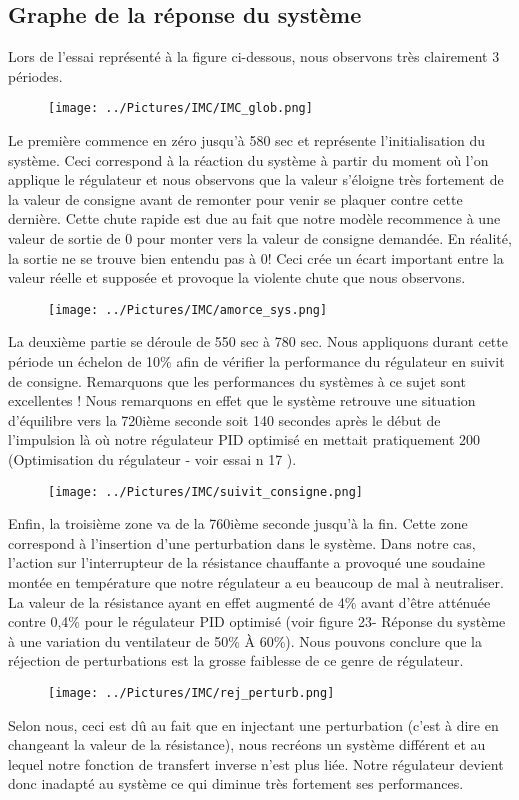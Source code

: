 \subsection{Graphe de la réponse du système}
Lors de l'essai représenté à la figure ci-dessous, nous observons très clairement 3 périodes.
\begin{figure}[H]
\texttt{[image: ../Pictures/IMC/IMC\_glob.png]}
\end{figure}
Le première commence en zéro jusqu'à 580 sec et représente l'initialisation du système. Ceci correspond à la réaction du système à partir du moment où l'on applique le régulateur et nous observons que la valeur s'éloigne très fortement de la valeur de consigne avant de remonter pour venir se plaquer contre cette dernière. Cette chute rapide est due au fait que notre modèle recommence à une valeur de sortie de 0 pour monter vers la valeur de consigne demandée. En réalité, la sortie ne se trouve bien entendu pas à 0! Ceci crée un écart important entre la valeur réelle et supposée et provoque la violente chute que nous observons.

\begin{figure}[H]
\texttt{[image: ../Pictures/IMC/amorce\_sys.png]}
\end{figure}
La deuxième partie se déroule de 550 sec à 780 sec. Nous appliquons durant cette période un échelon de 10\% afin de vérifier la performance du régulateur en suivit de consigne. Remarquons que les performances du systèmes à ce sujet sont excellentes ! Nous remarquons en effet que le système retrouve une situation d'équilibre vers la 720ième seconde soit 140 secondes après le début de l'impulsion là où notre régulateur PID optimisé en mettait pratiquement 200 (Optimisation du régulateur - voir essai n 17 ). 
\begin{figure}[H]
\texttt{[image: ../Pictures/IMC/suivit\_consigne.png]}
\end{figure}
Enfin, la troisième zone va de la 760ième seconde jusqu'à la fin. Cette zone correspond à l'insertion  d'une perturbation dans le système. Dans notre cas, l'action sur l'interrupteur de la résistance chauffante a provoqué une soudaine montée en température que notre régulateur a eu beaucoup de mal à neutraliser. La valeur de la résistance ayant en effet augmenté de 4\% avant d'être atténuée contre 0,4\% pour le régulateur PID optimisé (voir figure 23- Réponse du système à une variation du ventilateur de 50\% À 60\%). Nous pouvons conclure que la réjection de perturbations est la grosse faiblesse de ce genre de régulateur. 
\begin{figure}[H]
\texttt{[image: ../Pictures/IMC/rej\_perturb.png]}
\end{figure}
Selon nous, ceci est dû au fait que en injectant une perturbation (c'est à dire en changeant la valeur de la résistance), nous recréons un système différent et au lequel notre fonction de transfert inverse n'est plus liée. Notre régulateur devient donc inadapté au système ce qui diminue très fortement ses performances. 


